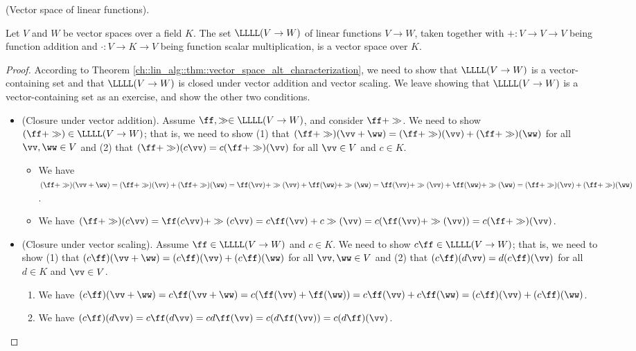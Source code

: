 \begin{theorem}
\label{ch::lin_alg::thm::vector_space_linear_functions}
    (Vector space of linear functions).

    Let $V$ and $W$ be vector spaces over a field $K$. The set $\LLLL(V \rightarrow W)$ of linear functions $V \rightarrow W$, taken together with $+:V \rightarrow V \rightarrow V$ being function addition and $\cdot:V \rightarrow K \rightarrow V$ being function scalar multiplication, is a vector space over $K$.
\end{theorem}

\begin{proof}
    According to Theorem \ref{ch::lin_alg::thm::vector_space_alt_characterization}, we need to show that $\LLLL(V \rightarrow W)$ is a vector-containing set and that $\LLLL(V \rightarrow W)$ is closed under vector addition and vector scaling. We leave showing that $\LLLL(V \rightarrow W)$ is a vector-containing set as an exercise, and show the other two conditions.

    \begin{itemize}
        \item (Closure under vector addition). Assume $\ff, \gg \in \LLLL(V \rightarrow W)$, and consider $\ff + \gg$. We need to show $(\ff + \gg) \in \LLLL(V \rightarrow W)$; that is, we need to show (1) that $(\ff + \gg)(\vv + \ww) = (\ff + \gg)(\vv) + (\ff + \gg)(\ww)$ for all $\vv, \ww \in V$ and (2) that $(\ff + \gg)(c\vv) = c(\ff + \gg)(\vv)$ for all $\vv \in V$ and $c \in K$.
        \begin{itemize}
            \item[1.] We have $(\ff + \gg)(\vv + \ww) = (\ff + \gg)(\vv) + (\ff + \gg)(\ww) = \ff(\vv) + \gg(\vv) + \ff(\ww) + \gg(\ww) = \ff(\vv) + \gg(\vv) + \ff(\ww) + \gg(\ww) = (\ff + \gg)(\vv) + (\ff + \gg)(\ww)$.
            \item[2.] We have $(\ff + \gg)(c\vv) = \ff(c\vv) + \gg(c\vv) = c\ff(\vv) + c\gg(\vv) = c(\ff(\vv) + \gg(\vv)) = c(\ff + \gg)(\vv)$.
        \end{itemize}
        \item (Closure under vector scaling). Assume $\ff \in \LLLL(V \rightarrow W)$ and $c \in K$. We need to show $c\ff \in \LLLL(V \rightarrow W)$; that is, we need to show (1) that $(c\ff)(\vv + \ww) = (c\ff)(\vv) + (c\ff)(\ww)$ for all $\vv, \ww \in V$ and (2) that $(c\ff)(d\vv) = d(c\ff)(\vv)$ for all $d \in K$ and $\vv \in V$.
        \begin{enumerate}
            \item[1.] We have $(c\ff)(\vv + \ww) = c \ff(\vv + \ww) = c (\ff(\vv) + \ff(\ww)) = c \ff(\vv) + c \ff(\ww) = (c\ff)(\vv) + (c\ff)(\ww)$.
            \item[2.] We have $(c\ff)(d\vv) = c\ff(d\vv) = cd\ff(\vv) = c(d\ff(\vv)) = c(d\ff)(\vv)$.
        \end{enumerate}
    \end{itemize}
\end{proof}

